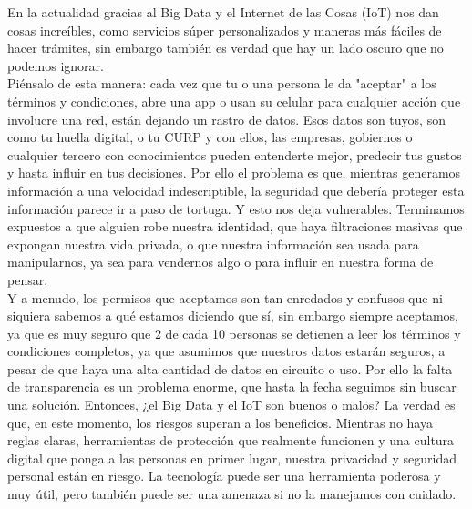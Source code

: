 \documentclass[12pt]{report}
\begin{document}
\begin{enumerate}[label=\textbf{\arabic*.}, leftmargin=*]
\begin{enumerate}[label=\textbf{\alph*.}, leftmargin=*, itemsep=1.0em]
En la actualidad gracias al Big Data y el Internet de las Cosas (IoT) nos dan cosas increíbles, como servicios súper personalizados y maneras más fáciles de hacer trámites, sin embargo también es verdad que hay un lado oscuro que no podemos ignorar.\\
Piénsalo de esta manera: cada vez que tu o una persona le da "aceptar" a los términos y condiciones, abre una app o usan su celular para cualquier acción que involucre una red, están dejando un rastro de datos. Esos datos son tuyos, son como tu huella digital, o tu CURP y con ellos, las empresas, gobiernos o cualquier tercero con conocimientos pueden entenderte mejor, predecir tus gustos y hasta influir en tus decisiones.
Por ello el problema es que, mientras generamos información a una velocidad indescriptible, la seguridad que debería proteger esta información parece ir a paso de tortuga. Y esto nos deja vulnerables. Terminamos expuestos a que alguien robe nuestra identidad, que haya filtraciones masivas que expongan nuestra vida privada, o que nuestra información sea usada para manipularnos, ya sea para vendernos algo o para influir en nuestra forma de pensar.\\

Y a menudo, los permisos que aceptamos son tan enredados y confusos que ni siquiera sabemos a qué estamos diciendo que sí, sin embargo siempre aceptamos, ya que es muy seguro que 2 de cada 10 personas se detienen a leer los términos y condiciones completos, ya que asumimos que nuestros datos estarán seguros, a pesar de que haya una alta cantidad de datos en circuito o uso. Por ello la falta de transparencia es un problema enorme, que hasta la fecha seguimos sin buscar una solución.
Entonces, ¿el Big Data y el IoT son buenos o malos? La verdad es que, en este momento, los riesgos superan a los beneficios. Mientras no haya reglas claras, herramientas de protección que realmente funcionen y una cultura digital que ponga a las personas en primer lugar, nuestra privacidad y seguridad personal están en riesgo. La tecnología puede ser una herramienta poderosa y muy útil, pero también puede ser una amenaza si no la manejamos con cuidado.\\


\end{enumerate}
\end{enumerate}
\end{document}
